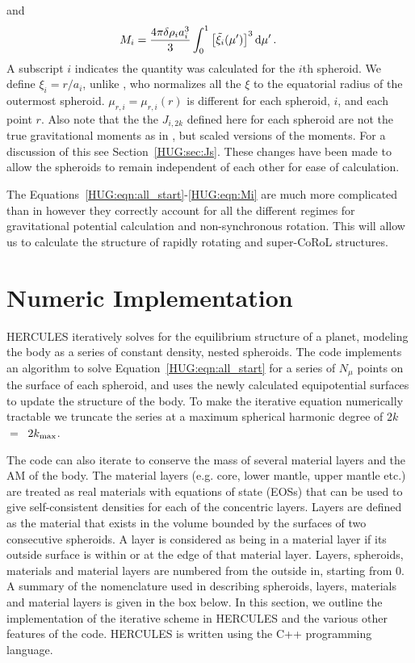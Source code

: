 \documentclass[11pt, oneside]{article}   	%
\begin{document}
%
and
%
\begin{align}
& \begin{aligned}
\label{HUG:eqn:Mi}
M_i {} &= \frac{4 \pi \delta \rho_i a_i^3}{3}  \int_{0}^{1} \left [ \tilde{\xi_i}(\mu') \right ]^3 {\rm d}\mu' \,.
\end{aligned}
\end{align}
%
A subscript $i$ indicates the quantity was calculated for the $i$th spheroid. We define $\xi_i=r/a_i$, unlike \cite{Hubbard2013}, who normalizes all the $\xi$ to the equatorial radius of the outermost spheroid. $\mu_{r,i}=\mu_{r,i}(r)$ is different for each spheroid, $i$, and each point $r$.
Also note that the the $J_{i,2k}$ defined here for each spheroid are not the true gravitational moments as in \cite{Hubbard2013}, but scaled versions of the moments.
For a discussion of this see Section~\ref{HUG:sec:Js}.
These changes have been made to allow the spheroids to remain independent of each other for ease of calculation.

The Equations~\ref{HUG:eqn:all_start}-\ref{HUG:eqn:Mi} are much more complicated than in \cite{Hubbard2013} however they correctly account for all the different regimes for gravitational potential calculation and non-synchronous rotation. 
This will allow us to calculate the structure of rapidly rotating and super-CoRoL structures.

\section{Numeric Implementation}
\label{HUG:sec:numerics}

HERCULES iteratively solves for the equilibrium structure of a planet, modeling the body as a series of constant density, nested spheroids.
The code implements an algorithm to solve Equation~\ref{HUG:eqn:all_start} for a series of $N_\mu$ points on the surface of each spheroid, and uses the newly calculated equipotential surfaces to update the structure of the body. To make the iterative equation numerically tractable we truncate the series at a maximum spherical harmonic degree of $2k$~$=$~$2k_{\rm max}$.

The code can also iterate to conserve the mass of several material layers and the AM of the body.
The material layers (e.g. core, lower mantle, upper mantle etc.) are treated as real materials with equations of state (EOSs) that can be used to give self-consistent densities for each of the concentric layers.  Layers are defined as the material that exists in the volume bounded by the surfaces of two consecutive spheroids.
A layer is considered as being in a material layer if its outside surface is within or at the edge of that material layer.
Layers, spheroids, materials and material layers are numbered from the outside in, starting from $0$.
A summary of the nomenclature used in describing spheroids, layers, materials and material layers is given in the box below.
In this section, we outline the implementation of the iterative scheme in HERCULES and the various other features of the code. HERCULES is written using the C++ programming language.
\end{document}
